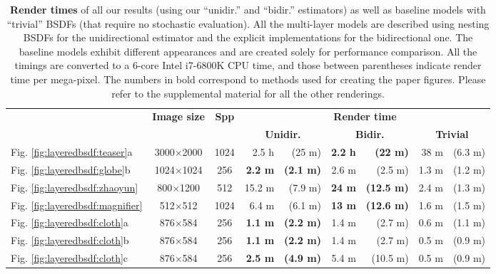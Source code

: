 \begin{table}[h]
	\centering
	\caption[Render times of all our results]{\label{tab:layeredbsdf:performance}
		\textbf{Render times} of all our results (using our ``unidir.'' and ``bidir.'' estimators) as well as baseline models with ``trivial'' BSDFs (that require no stochastic evaluation).
		All the multi-layer models are described using nesting BSDFs for the unidirectional estimator and the explicit implementations for the bidirectional one.
		The baseline models exhibit different appearances and are created solely for performance comparison.
		All the timings are converted to a 6-core Intel i7-6800K CPU time, and those between parentheses indicate render time per mega-pixel.
		The numbers in bold correspond to methods used for creating the paper figures.
		Please refer to the supplemental material for all the other renderings.
	}
   	\addtolength{\tabcolsep}{0pt} 
	\begin{tabular}{l|c|c|rr|rr|rr}
	& \multirow{2}{*}{\textbf{Image size}}  & \multirow{2}{*}{\textbf{Spp}} & \multicolumn{6}{c}{\textbf{Render time}}\\
	& & & \multicolumn{2}{c}{\textbf{Unidir.}} & \multicolumn{2}{c}{\textbf{Bidir.}} & \multicolumn{2}{c}{\textbf{Trivial}}\\
	\hline
	Fig. \ref{fig:layeredbsdf:teaser}a 			& 3000$\times$2000 & 1024 & 2.5 h  		   	& (25 m) 			& \textbf{2.2 h}& \textbf{(22 m)}   & 38 m  & (6.3 m)\\
	Fig. \ref{fig:layeredbsdf:globe}b 			& 1024$\times$1024 & 256  & \textbf{2.2 m} 	& \textbf{(2.1 m)} 	& 2.6 m 		& (2.5 m)   		& 1.3 m & (1.2 m)\\
	Fig. \ref{fig:layeredbsdf:zhaoyun} 			& 800$\times$1200  & 512  & 15.2 m   	   	& (7.9 m)		 	& \textbf{24 m} & \textbf{(12.5 m)} & 2.4 m & (1.3 m)\\
	Fig. \ref{fig:layeredbsdf:magnifier} 		& 512$\times$512   & 1024 & 6.4 m 			& (6.1 m) 			& \textbf{13 m} & \textbf{(12.6 m)} & 1.6 m & (1.5 m)\\
	Fig. \ref{fig:layeredbsdf:cloth}a 			& 876$\times$584   & 256  & \textbf{1.1 m} 	& \textbf{(2.2 m)} 	& 1.4 m 		& (2.7 m)   		& 0.6 m & (1.1 m)\\
	Fig. \ref{fig:layeredbsdf:cloth}b 			& 876$\times$584   & 256  & \textbf{1.1 m} 	& \textbf{(2.2 m)} 	& 1.4 m 		& (2.7 m)		   	& 0.5 m & (0.9 m)\\
	Fig. \ref{fig:layeredbsdf:cloth}c 			& 876$\times$584   & 256  & \textbf{2.5 m} 	& \textbf{(4.9 m)}	& 5.4 m 		& (10.5 m)  		& 0.5 m & (0.9 m)\\

\end{tabular}
\end{table}
